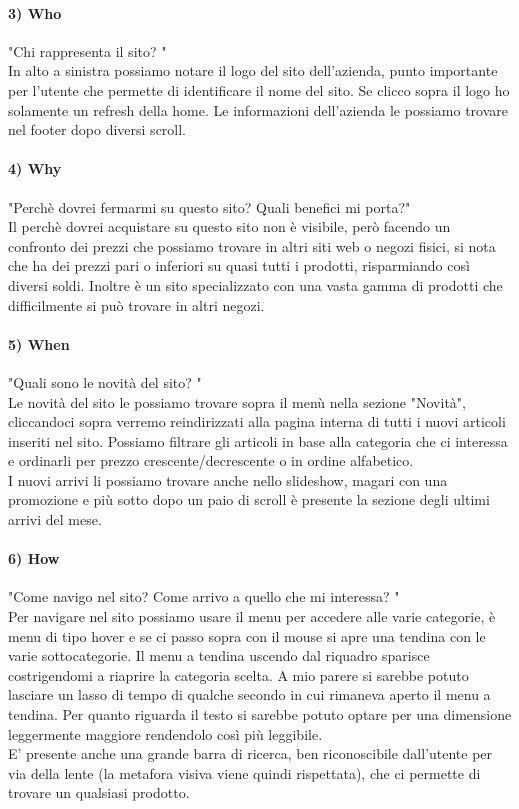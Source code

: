 \documentclass[12pt]{article}
\begin{document}
	\paragraph{3) Who} "Chi rappresenta il sito? "
	\\
	In alto a sinistra possiamo notare il logo del sito dell'azienda, punto importante per l'utente che permette di identificare il nome del sito. Se clicco sopra il logo ho solamente un refresh della home. Le informazioni dell'azienda le possiamo trovare nel footer dopo diversi scroll. 
	\paragraph{4) Why} "Perchè dovrei fermarmi su questo sito? Quali benefici mi porta?"
	\\
	Il perchè dovrei acquistare su questo sito non è visibile, però facendo un confronto dei prezzi che possiamo trovare in altri siti web o negozi fisici, si nota che ha dei prezzi pari o inferiori su quasi tutti i prodotti, risparmiando così diversi soldi. Inoltre è un sito specializzato con una vasta gamma di prodotti che difficilmente si può trovare in altri negozi.
	\paragraph{5) When} "Quali sono le novità del sito? "
	\\
	Le novità del sito le possiamo trovare sopra il menù nella sezione "Novità", cliccandoci sopra verremo reindirizzati alla pagina interna di tutti i nuovi articoli inseriti nel sito. Possiamo filtrare gli articoli in base alla categoria che ci interessa e ordinarli per prezzo crescente/decrescente o in ordine alfabetico. \\
	I nuovi arrivi li possiamo trovare anche nello slideshow, magari con una promozione e più sotto dopo un paio di scroll è presente la sezione degli ultimi arrivi del mese.
	\paragraph{6) How} "Come navigo nel sito? Come arrivo a quello che mi interessa? "
	\\
	Per navigare nel sito possiamo usare il menu per accedere alle varie categorie, è menu di tipo hover e se ci passo sopra con il mouse si apre una tendina con le varie sottocategorie. Il menu a tendina uscendo dal riquadro sparisce costrigendomi a riaprire la categoria scelta. A mio parere si sarebbe potuto lasciare un lasso di tempo di qualche secondo in cui rimaneva aperto il menu a tendina. Per quanto riguarda il testo si sarebbe potuto optare per una dimensione leggermente maggiore rendendolo così più leggibile.  \\
	E' presente anche una grande barra di ricerca, ben riconoscibile dall'utente per via della lente (la metafora visiva viene quindi rispettata), che ci permette di trovare un qualsiasi prodotto.
\end{document}
